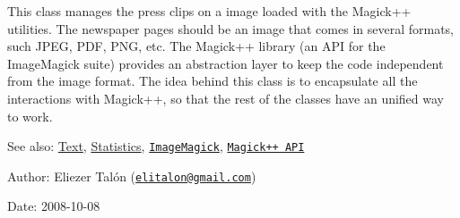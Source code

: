 This class manages the press clips on a image loaded with the Magick++ utilities. The newspaper pages should be an image that comes in several formats, such JPEG, PDF, PNG, etc. The Magick++ library (an API for the ImageMagick suite) provides an abstraction layer to keep the code independent from the image format. The idea behind this class is to encapsulate all the interactions with Magick++, so that the rest of the classes have an unified way to work.

\begin{Desc}
\item[See also:]\hyperlink{class_text}{Text}, \hyperlink{class_statistics}{Statistics}, \href{http://www.imagemagick.org}{\tt ImageMagick}, \href{http://www.imagemagick.org/Magick++/}{\tt Magick++ API}\end{Desc}
\begin{Desc}
\item[Author:]Eliezer Talón (\href{mailto:elitalon@gmail.com}{\tt elitalon@gmail.com}) \end{Desc}
\begin{Desc}
\item[Date:]2008-10-08 \end{Desc}


